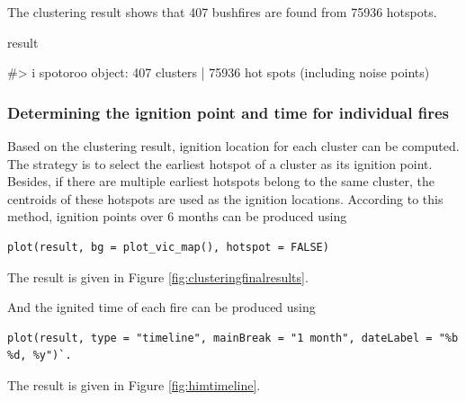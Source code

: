 The clustering result shows that 407 bushfires are found from 75936
hotspots.

\begin{Schunk}
\begin{Sinput}
result
\end{Sinput}
\begin{Soutput}
#> i spotoroo object: 407 clusters | 75936 hot spots (including noise points)
\end{Soutput}
\end{Schunk}

\hypertarget{determining-the-ignition-point-and-time-for-individual-fires}{%
\subsubsection{Determining the ignition point and time for individual
fires}\label{determining-the-ignition-point-and-time-for-individual-fires}}

Based on the clustering result, ignition location for each cluster can
be computed. The strategy is to select the earliest hotspot of a cluster
as its ignition point. Besides, if there are multiple earliest hotspots
belong to the same cluster, the centroids of these hotspots are used as
the ignition locations. According to this method, ignition points over 6
months can be produced using

\begin{verbatim}
plot(result, bg = plot_vic_map(), hotspot = FALSE)
\end{verbatim}

The result is given in Figure \ref{fig:clusteringfinalresults}.

And the ignited time of each fire can be produced using

\begin{verbatim}
plot(result, type = "timeline", mainBreak = "1 month", dateLabel = "%b %d, %y")`. 
\end{verbatim}

The result is given in Figure \ref{fig:himtimeline}.

